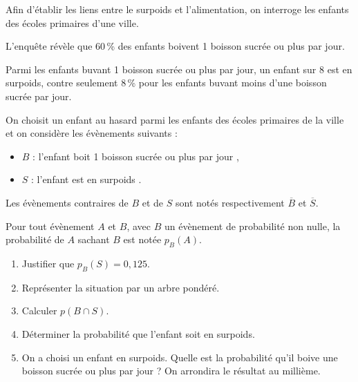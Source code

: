 \medskip

Afin d'établir les liens entre le surpoids et l'alimentation, on interroge les enfants des écoles primaires d'une ville.

L'enquête révèle que 60\,\% des enfants boivent 1 boisson sucrée ou plus par jour.

Parmi les enfants buvant 1 boisson sucrée ou plus par jour, un enfant sur 8 est en surpoids, contre seulement 8\,\% pour les enfants buvant moins d'une boisson sucrée par jour.
 
On choisit un enfant au hasard parmi les enfants des écoles primaires de la ville et on considère les évènements suivants :

\begin{itemize}
\item $B$ : \og l'enfant boit 1 boisson sucrée ou plus par jour \fg,
\item $S$ : \og l'enfant est en surpoids \fg.
\end{itemize}

Les évènements contraires de $B$ et de $S$ sont notés respectivement $\overline{B}$ et $\overline{S}$.

Pour tout évènement $A$ et $B$, avec $B$ un évènement de probabilité non nulle, la probabilité de $A$ sachant $B$ est notée $p_B(A)$.

\medskip

\begin{enumerate}
\item Justifier que $p_B(S) = 0,125$.
\item Représenter la situation par un arbre pondéré.
\item Calculer $p(B \cap S)$.
\item Déterminer la probabilité que l'enfant soit en surpoids.
\item On a choisi un enfant en surpoids. Quelle est la probabilité qu'il boive une boisson sucrée ou plus par jour ? On arrondira le résultat au millième.
\end{enumerate}

\vspace{0,5cm}

